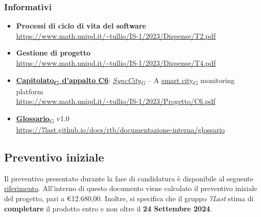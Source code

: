 \subsubsection{Informativi}
\begin{itemize}
	\item \textbf{Processi di ciclo di vita del software} \\
	      \url{https://www.math.unipd.it/~tullio/IS-1/2023/Dispense/T2.pdf}
	\item \textbf{Gestione di progetto} \\
	      \url{https://www.math.unipd.it/~tullio/IS-1/2023/Dispense/T4.pdf}
	\item \href{https://7last.github.io/docs/rtb/documentazione-interna/glossario\#capitolato}{\textbf{Capitolato\textsubscript{G} d'appalto C6}}: \href{https://7last.github.io/docs/rtb/documentazione-interna/glossario\#synccity}{\textit{SyncCity\textsubscript{G}}} – A \href{https://7last.github.io/docs/rtb/documentazione-interna/glossario\#smart-city}{smart city\textsubscript{G}} monitoring platform\\
           \url{https://www.math.unipd.it/~tullio/IS-1/2023/Progetto/C6.pdf}
	\item \href{https://7last.github.io/docs/rtb/documentazione-interna/glossario\#glossario}{\textbf{Glossario}\textsubscript{G}} v1.0\\
	      \url{https://7last.github.io/docs/rtb/documentazione-interna/glossario}
\end{itemize}

\subsection{Preventivo iniziale}
Il preventivo presentato durante la fase di candidatura è disponibile al seguente \uline{\href{https://7last.github.io/docs/candidatura/preventivo-costi-assunzione-impegni}{riferimento}}.
All'interno di questo documento viene calcolato il preventivo iniziale del progetto, pari a €12.680,00.
Inoltre, si specifica che il gruppo \textit{7Last} stima di \textbf{completare} il prodotto entro e non oltre il \textbf{24 Settembre 2024}.
